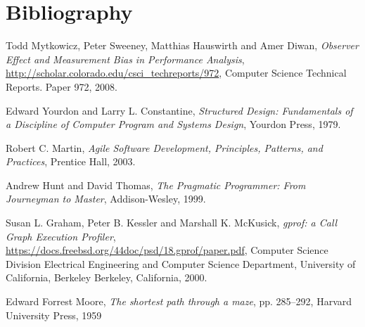 \chapter{Bibliography}
\begin{thebibliography}{9}
            
  Todd Mytkowicz, Peter Sweeney, Matthias Hauswirth and Amer Diwan,
  \emph{Observer Effect and Measurement Bias in Performance Analysis},
  \url{http://scholar.colorado.edu/csci_techreports/972},
  Computer Science Technical Reports. Paper 972,
  2008.
      
  Edward Yourdon and Larry L. Constantine,
  \emph{Structured Design: Fundamentals of a Discipline of Computer Program and Systems Design},
  Yourdon Press,
  1979.
    
  Robert C. Martin,
  \emph{Agile Software Development, Principles, Patterns, and Practices},
  Prentice Hall,
  2003.
    
  Andrew Hunt and David Thomas,
  \emph{The Pragmatic Programmer: From Journeyman to Master},
  Addison-Wesley,
  1999.
            
  Susan L. Graham, Peter B. Kessler and Marshall K. McKusick,
  \emph{gprof: a Call Graph Execution Profiler},
  \url{https://docs.freebsd.org/44doc/psd/18.gprof/paper.pdf},
  Computer Science Division Electrical Engineering and Computer Science Department, University of California, Berkeley Berkeley, California,
  2000.
%            

  Edward Forrest Moore,
  \emph{The shortest path through a maze},
  pp. 285–292,
  Harvard University Press,
  1959
\end{thebibliography}